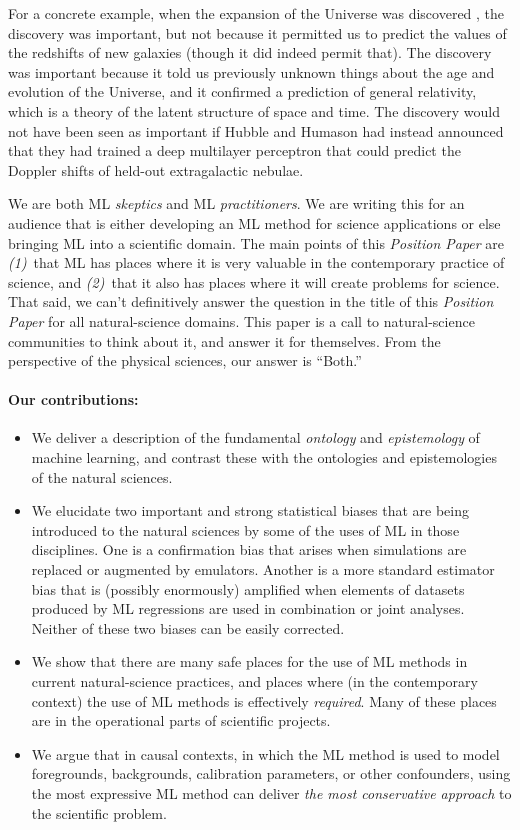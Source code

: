 \documentclass[10pt]{article}
\newcommand{\documentname}{\textsl{Position Paper}}
\begin{document}
For a concrete example, when the expansion of the Universe was discovered \cite{expansion, expansion2}, the discovery was important, but not because it permitted us to predict the values of the redshifts of new galaxies (though it did indeed permit that).
The discovery was important because it told us previously unknown things about the age and evolution of the Universe, and it confirmed a prediction of general relativity, which is a theory of the latent structure of space and time.
The discovery would not have been seen as important if Hubble and Humason had instead announced that they had trained a deep multilayer perceptron that could predict the Doppler shifts of held-out extragalactic nebulae.

We are both ML \emph{skeptics} and ML \emph{practitioners}.
We are writing this for an audience that is either developing an ML method for science applications or else bringing ML into a scientific domain.
The main points of this \documentname{} are \textsl{(1)}~that ML has places where it is very valuable in the contemporary practice of science, and \textsl{(2)}~that it also has places where it will create problems for science.
That said, we can't definitively answer the question in the title of this \documentname{} for all natural-science domains.
This paper is a call to natural-science communities to think about it, and answer it for themselves.
From the perspective of the physical sciences, our answer is ``Both.''

\paragraph{Our contributions:}
\begin{itemize}
  \item We deliver a description of the fundamental \emph{ontology} and \emph{epistemology} of machine learning, and contrast these with the ontologies and epistemologies of the natural sciences.
  \item We elucidate two important and strong statistical biases that are being introduced to the natural sciences by some of the uses of ML in those disciplines. One is a confirmation bias that arises when simulations are replaced or augmented by emulators. Another is a more standard estimator bias that is (possibly enormously) amplified when elements of datasets produced by ML regressions are used in combination or joint analyses. Neither of these two biases can be easily corrected.
  \item We show that there are many safe places for the use of ML methods in current natural-science practices, and places where (in the contemporary context) the use of ML methods is effectively \emph{required}. Many of these places are in the operational parts of scientific projects.
  \item We argue that in causal contexts, in which the ML method is used to model foregrounds, backgrounds, calibration parameters, or other confounders, using the most expressive ML method can deliver \emph{the most conservative approach} to the scientific problem.
\end{itemize}
\end{document}
